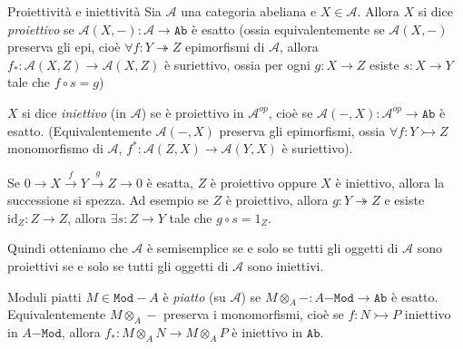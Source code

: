 \begin{definition}{Proiettività e iniettività}
    Sia \(\mathcal{A}\) una categoria abeliana e \(X \in \mathcal{A}\). Allora
    \(X\) si dice \emph{proiettivo} se \(\mathcal{A}{(X, -)} : \mathcal{A} \to
    \mathtt{Ab}\) è esatto (ossia equivalentemente se \(\mathcal{A}{(X, -)}\)
    preserva gli epi, cioè \(\forall f : Y \twoheadrightarrow Z\) epimorfismi di
    \(\mathcal{A}\), allora \(f_* : \mathcal{A}{(X, Z)} \to \mathcal{A}{(X,
    Z)}\) è suriettivo, ossia per ogni \(g : X \to Z\) esiste \(s : X \to Y\)
    tale che \(f \circ s = g\))

    \(X\) si dice \emph{iniettivo} (in \(\mathcal{A}\)) se è proiettivo in
    \(\mathcal{A}^{op}\), cioè se \(\mathcal{A}{(-, X)} : \mathcal{A}^{op} \to
    \mathtt{Ab}\) è esatto. (Equivalentemente \(\mathcal{A}{(-, X)}\) preserva
    gli epimorfismi, ossia \(\forall f : Y \rightarrowtail Z\) monomorfismo di
    \(\mathcal{A}\), \(f^{*} : \mathcal{A}{(Z, X)} \to \mathcal{A}{(Y, X)}\) è
    suriettivo).
\end{definition}

\begin{remark}{}
    Se \(0 \to X \overset{f}{\to} Y \overset{g}{\to} Z \to 0\) è esatta, \(Z\) è
    proiettivo oppure \(X\) è iniettivo, allora la successione si spezza. Ad
    esempio se \(Z\) è proiettivo, allora \(g : Y \twoheadrightarrow Z \) e
    esiste \(\mathrm{id}_Z : Z \to Z\), allora \(\exists s : Z \to Y\) tale che
    \(g \circ s = 1_Z\).

    Quindi otteniamo che \(\mathcal{A}\) è semisemplice se e solo se tutti gli
    oggetti di \(\mathcal{A}\) sono proiettivi se e solo se tutti gli oggetti di
    \(\mathcal{A}\) sono iniettivi.
\end{remark}

\begin{definition}{Moduli piatti}
    \(M \in \mathtt{Mod}-A\) è \emph{piatto} (su \(\mathcal{A}\)) se 
    \(M \otimes_A - : A\mathtt{-Mod} \to \mathtt{Ab}\) è esatto.
    Equivalentemente \(M \otimes_A -\) preserva i monomorfismi, cioè se \(f : N
    \rightarrowtail P\) iniettivo in \(A\mathtt{-Mod}\), allora \(f_* :
    M\otimes_A N \to M \otimes_A P\) è iniettivo in \(\mathtt{Ab}\).
\end{definition}

